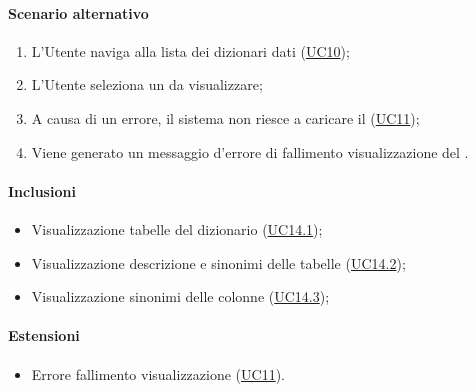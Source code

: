 \paragraph*{Scenario alternativo}
\begin{enumerate}
  \item L’Utente naviga alla lista dei dizionari dati (\hyperref[UC10]{UC10});
  \item L'Utente seleziona un  da visualizzare;
  \item A causa di un errore, il sistema non riesce a caricare il  (\hyperref[UC11]{UC11});
  \item Viene generato un messaggio d'errore di fallimento visualizzazione del .
\end{enumerate}

\paragraph*{Inclusioni}
\begin{itemize}
  \item Visualizzazione tabelle del dizionario (\hyperref[UC14point1]{UC14.1});
  \item Visualizzazione descrizione e sinonimi delle tabelle (\hyperref[UC14point2]{UC14.2});
  \item Visualizzazione sinonimi delle colonne (\hyperref[UC14point3]{UC14.3});
\end{itemize}

\paragraph*{Estensioni}
\begin{itemize}
  \item Errore fallimento visualizzazione  (\hyperref[UC11]{UC11}).
\end{itemize}


